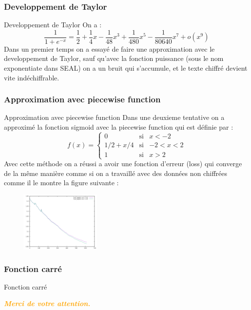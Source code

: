 \documentclass{beamer}
\begin{document}
\subsubsection{Developpement de Taylor}
\begin{frame}{Developpement de Taylor}
On a :
\newcommand\omicron{o}
 $$\dfrac{1}{1+e^{-x}} = \dfrac{1}{2} + \dfrac{1}{4}x - \dfrac{1}{48}x^3 + \dfrac{1}{480}x^5 - \dfrac{1}{80640}x^7 + \omicron(x^9)$$
Dans un premier temps on a essayé de faire une approximation avec le developpement de Taylor, sauf qu'avec la fonction puissance (sous le nom exponentiate dans SEAL) on a un bruit qui s'accumule, et le texte chiffré devient vite indéchiffrable. 

\end{frame}
\subsubsection{Approximation avec piecewise function}
\begin{frame}{Approximation avec piecewise function}
Dans une deuxieme tentative on a approximé la fonction sigmoid avec la piecewise function qui est définie par :\newline
 \begin{equation}
f(x)=
\left\lbrace
\begin{array}{ccc}
0  & \mbox{si} & x<-2\\
1/2 + x/4 & \mbox{si} & -2<x<2\\
1 & \mbox{si} & x>2
\end{array}\right.
\end{equation}
Avec cette méthode on a réussi a avoir une fonction d'erreur (loss) qui converge de la même manière comme si on a travaillé avec des données non chiffrées comme il le montre la figure suivante :
\begin{figure}[h!]\begin{center}
             \includegraphics[width=4cm]{loss_logistic_regression.png}
             \end{center}
             \end{figure}

 \end{frame}
\subsubsection{Fonction carré}
\begin{frame}{Fonction carré}
\end{frame}
\begin{frame}
	\begin{center}
	\textcolor{orange}{\textbf{\textit{Merci de votre attention.}}}
	\end{center}
\end{frame}
\end{document}
